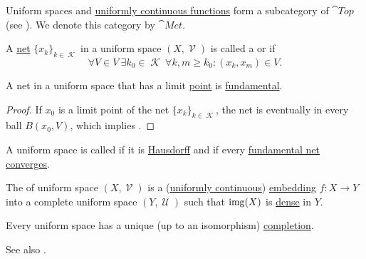 \begin{definition}\label{def:category_of_uniform_spaces}
  Uniform spaces and \hyperref[def:uniform_continuity]{uniformly continuous functions} form a subcategory of \( \cat{Top} \) (see ). We denote this category by \( \cat{Met} \).
\end{definition}

\begin{definition}\label{def:fundamental_net}
  A \hyperref[def:topological_net]{net} \( \{ x_k \}_{k \in \mscrK} \) in a uniform space \( (X, \mscrV) \) is called a  or  if
  \begin{equation*}
    \forall V \in V \ \exists k_0 \in \mscrK \ \forall k, m \geq k_0 : (x_k, x_m) \in V.
  \end{equation*}
\end{definition}

\begin{lemma}\label{thm:convergent_net_is_fundamental}
  A net in a uniform space that has a limit \hyperref[def:net_convergence/limit]{point} is \hyperref[def:fundamental_net]{fundamental}.
\end{lemma}
\begin{proof}
  If \( x_0 \) is a limit point of the net \( \{ x_k \}_{k \in \mscrK} \), the net is eventually in every ball \( B(x_0, V) \), which implies .
\end{proof}

\begin{definition}\label{def:complete_uniform_space}
  A uniform space is called  if it is \hyperref[def:separation_axioms/T2]{Hausdorff} and if every \hyperref[def:fundamental_net]{fundamental net} \hyperref[def:net_convergence/limit]{converges}.

  The  of uniform space \( (X, \mscrV) \) is a (\hyperref[def:uniform_continuity]{uniformly continuous}) \hyperref[def:morphism_invertibility/left_cancellative]{embedding} \( f: X \to Y \) into a complete uniform space \( (Y, \mscrU) \) such that \( \operatorname{img}(X) \) is \hyperref[def:topologically_dense_set]{dense} in \( Y \).
\end{definition}

\begin{theorem}\label{thm:uniform_space_completion}
  Every uniform space has a unique (up to an isomorphism) \hyperref[def:complete_uniform_space]{completion}.

  See also .
\end{theorem}

